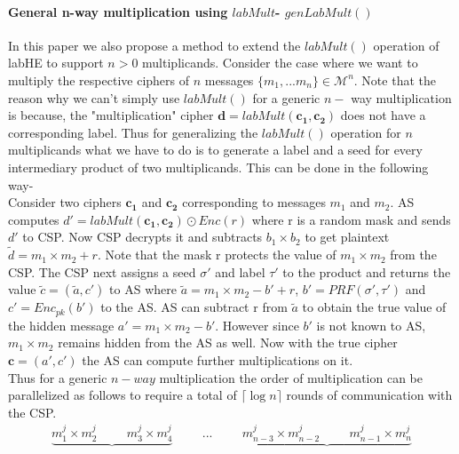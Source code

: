  \paragraph*{General n-way multiplication using $labMult$- $genLabMult()$}
In this paper we also propose a method to extend the $labMult()$ operation of labHE to support $n > 0$ multiplicands. 
Consider the case where we want to multiply the respective ciphers of  $n$ messages $\{m_1,...m_n\} \in \mathcal{M}^n$. Note that the reason why we can't simply use $labMult()$ for a generic $n-$ way multiplication is because, the "multiplication" cipher $\mathbf{d}=labMult(\mathbf{c_1},\mathbf{c_2})$ does not have  a corresponding label. Thus for generalizing the $labMult()$ operation for $n$ multiplicands what we have to do is to generate a label and a seed for every intermediary product of two multiplicands. This can be done in the following way-  \\
Consider two ciphers $\mathbf{c_1}$ and $\mathbf{c_2}$ corresponding to messages $m_1$ and $m_2$. AS computes 
$d'=labMult(\mathbf{c_1,c_2}) \odot Enc(r)$ where r is a random mask and sends $d'$ to CSP. Now CSP decrypts it and subtracts $b_1\times b_2$ to get plaintext $\tilde{d}=m_1\times m_2+r$. Note that the mask r protects the value of $m_1\times m_2$ from the CSP. The CSP next assigns a seed $\sigma'$ and label $\tau'$ to the product and returns the value $\tilde{c}=(\tilde{a},c')$ to AS where $\tilde{a}=m_1\times m_2 -b' +r$, $b'=PRF(\sigma',\tau')$ and $c'=Enc_{pk}(b')$ to the AS. AS can subtract r from $\tilde{a}$ to obtain the  true value of the hidden message $a'=m_1\times m_2 - b'$. However since $b'$ is not known to AS, $m_1\times m_2$ remains hidden from the AS as well. Now with the true cipher $\mathbf{c}=(a',c')$ the AS can compute further multiplications on it. \\
Thus for a generic $n-way$ multiplication the order of multiplication can be parallelized as follows to require a total of $\lceil \log n\rceil$ rounds of communication with the CSP. 
\begin{gather*}
\underbrace{m^j_1\times m^j_2 \hspace{1cm}      m^j_3\times m^j_4}    \hspace{1cm}    ... \hspace{1cm}\underbrace{m^j_{n-3} \times m^j_{n-2} \hspace{1cm}  m^j_{n-1}\times m^j_n}\\
\end{gather*}
\\

